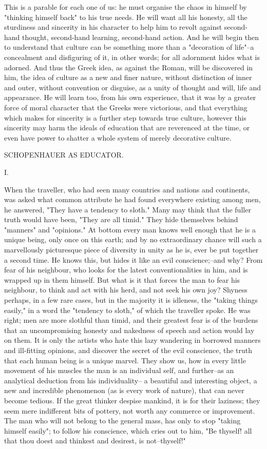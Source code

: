 This is a parable for each one of us: he must organise the chaos in
himself by "thinking himself back" to his true needs. He will want
all his honesty, all the sturdiness and sincerity in his character to
help him to revolt against second-hand thought, second-hand learning,
second-hand action. And he will begin then to understand that culture
can be something more than a "decoration of life"--a concealment and
disfiguring of it, in other words; for all adornment hides what is
adorned. And thus the Greek idea, as against the Roman, will be
discovered in him, the idea of culture as a new and finer nature,
without distinction of inner and outer, without convention or
disguise, as a unity of thought and will, life and appearance. He
will learn too, from his own experience, that it was by a greater
force of moral character that the Greeks were victorious, and that
everything which makes for sincerity is a further step towards true
culture, however this sincerity may harm the ideals of education that
are reverenced at the time, or even have power to shatter a whole
system of merely decorative culture.




SCHOPENHAUER AS EDUCATOR.


I.

When the traveller, who had seen many countries and nations and
continents, was asked what common attribute he had found everywhere
existing among men, he answered, "They have a tendency to sloth."
Many may think that the fuller truth would have been, "They are all
timid." They hide themselves behind "manners" and "opinions." At
bottom every man knows well enough that he is a unique being, only
once on this earth; and by no extraordinary chance will such a
marvellously picturesque piece of diversity in unity as he is, ever
be put together a second time. He knows this, but hides it like an
evil conscience;--and why? From fear of his neighbour, who looks for
the latest conventionalities in him, and is wrapped up in them
himself. But what is it that forces the man to fear his neighbour, to
think and act with his herd, and not seek his own joy? Shyness
perhaps, in a few rare cases, but in the majority it is idleness, the
"taking things easily," in a word the "tendency to sloth," of which
the traveller spoke. He was right; men are more slothful than timid,
and their greatest fear is of the burdens that an uncompromising
honesty and nakedness of speech and action would lay on them. It is
only the artists who hate this lazy wandering in borrowed manners and
ill-fitting opinions, and discover the secret of the evil conscience,
the truth that each human being is a unique marvel. They show us, how
in every little movement of his muscles the man is an individual
self, and further--as an analytical deduction from his individuality--
a beautiful and interesting object, a new and incredible phenomenon
(as is every work of nature), that can never become tedious. If the
great thinker despise mankind, it is for their laziness; they seem
mere indifferent bits of pottery, not worth any commerce or
improvement. The man who will not belong to the general mass, has
only to stop "taking himself easily"; to follow his conscience, which
cries out to him, "Be thyself! all that thou doest and thinkest and
desirest, is not--thyself!"

